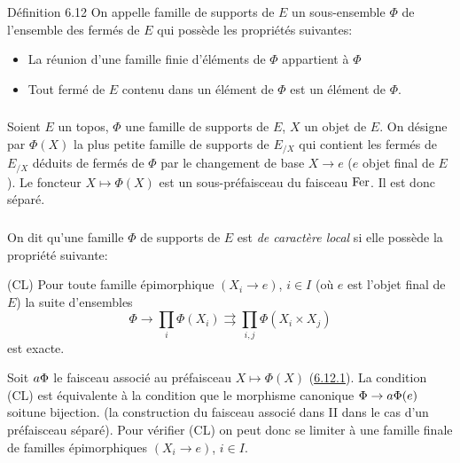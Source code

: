 \documentclass[10pt]{../fichiers-configuration-latex/smfart}
\begin{document}
\begin{enonce*}{Définition 6.12}
On appelle famille de supports de $E$ un sous-ensemble $\Phi$ de
l'ensemble des fermés de $E$ qui possède les propriétés
suivantes:
\begin{itemize}
\item[{\rm (S1)}] La réunion d'une famille finie d'éléments de $\Phi$
  appartient à $\Phi$
\item[{\rm (S2)}] Tout fermé de $E$ contenu dans un élément de $\Phi$
  est un élément de $\Phi$.
\end{itemize}
\end{enonce*}

\setcounter{subsection}{12}
\setcounter{subsubsection}{0}
\subsubsection{}
Soient $E$ un topos, $\Phi$ une famille de supports de $E$, $X$ un
objet de $E$. On désigne par $\Phi(X)$ la plus petite famille de
supports de $E_{/X}$ qui contient les fermés de $E_{/X}$ déduits
de fermés de $\Phi$ par le changement de base $X \to e$ ($e$ objet
final de $E$). Le foncteur $X \mapsto \Phi(X)$ est un sous-préfaisceau
du faisceau $\operatorname{Fer}$. Il est donc séparé.

\subsubsection{}
On dit qu'une famille $\Phi$ de supports de $E$ est \emph{de
  caractère local} si elle possède la propriété suivante:

\noindent
(CL) Pour toute famille épimorphique $(X_i \to e)$, $i \in I$ (où
  $e$ est l'objet final de $E$) la suite d'ensembles
$$
\Phi \to \prod_i \Phi(X_i) \rightrightarrows \prod_{i, j} \Phi(X_i
\times X_j)
$$
est exacte.

Soit ${a\Phi}$ le faisceau associé au préfaisceau $X \mapsto
\Phi(X)$ (\hyperref[V.subsubsec6.12.1]{6.12.1}). La condition (CL) est
équivalente à la condition que le morphisme canonique $\Phi \to
\vieuxsheaf{a\Phi} (e)$ soit\pageoriginale une bijection. (\cf la
construction du faisceau associé dans II dans le cas d'un
préfaisceau séparé). Pour vérifier (CL) on peut donc se limiter à
une famille finale de familles épimorphiques $(X_i \to e)$, $i \in
I$.
\end{document}
